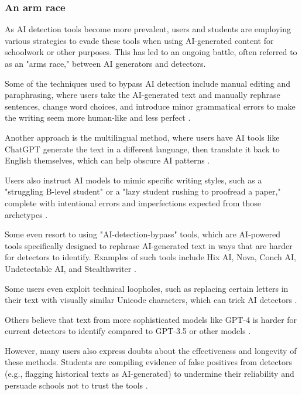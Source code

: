 \documentclass{article}
\begin{document}
\subsubsection{An arm race}
As AI detection tools become more prevalent, users and students are employing various strategies to evade
these tools when using AI-generated content for schoolwork or other purposes. This has led to an ongoing
battle, often referred to as an "arms race," between AI generators and detectors.

Some of the techniques used to bypass AI detection include manual editing and paraphrasing, where users
take the AI-generated text and manually rephrase sentences, change word choices, and introduce minor
grammatical errors to make the writing seem more human-like and less perfect \cite{reddit_avoid_ai_detection}
\cite{reddit_fool_ai_detector}.

Another approach is the multilingual method, where users have AI tools like ChatGPT generate the text in a different language,
then translate it back to English themselves, which can help obscure AI patterns
\cite{reddit_bypass_ai_detection_1}.

Users also instruct AI models to mimic specific writing styles, such as a "struggling B-level student"
or a "lazy student rushing to proofread a paper," complete with intentional errors and imperfections
expected from those archetypes \cite{reddit_bypass_ai_detection_2}
\cite{reddit_fool_ai_detector}.

Some even resort to using "AI-detection-bypass" tools, which are AI-powered tools specifically designed
to rephrase AI-generated text in ways that are harder for detectors to identify. Examples of such tools
include Hix AI, Nova, Conch AI, Undetectable AI, and Stealthwriter
\cite{reddit_avoid_ai_detection}
\cite{reddit_bypass_ai_detection_2}
\cite{reddit_bypass_ai_detection_3}.

Some users even exploit technical loopholes, such as replacing certain letters in their text with visually
similar Unicode characters, which can trick AI detectors
\cite{reddit_bypass_ai_detection_4}.

Others believe that text from more sophisticated models like GPT-4 is harder for current detectors
to identify compared to GPT-3.5 or other models \cite{reddit_bypass_ai_detection_1}.

However, many users also express doubts about the effectiveness and longevity of these methods.
Students are compiling evidence of false positives from detectors (e.g., flagging historical texts as AI-generated)
to undermine their reliability and persuade schools not to trust the tools \cite{reddit_fool_ai_detector}
\cite{reddit_bypass_ai_detection_4}.
\end{document}
